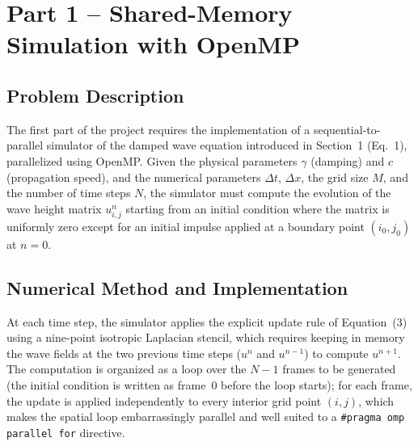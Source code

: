 \section{Part 1 -- Shared-Memory Simulation with OpenMP}
\label{sec:openmp}

\subsection{Problem Description}
The first part of the project requires the implementation of a
sequential-to-parallel simulator of the damped wave equation
introduced in Section~1 (Eq.~1), parallelized using OpenMP. Given
the physical parameters $\gamma$ (damping) and $c$ (propagation
speed), and the numerical parameters $\Delta t$, $\Delta x$, the
grid size $M$, and the number of time steps $N$, the simulator must
compute the evolution of the wave height matrix $u^n_{i,j}$ starting
from an initial condition where the matrix is uniformly zero except
for an initial impulse applied at a boundary point $(i_0, j_0)$ at
$n=0$.

\subsection{Numerical Method and Implementation}
\label{sec:numerical-method}
At each time step, the simulator applies the explicit update rule
of Equation~(3) using a nine-point isotropic Laplacian stencil,
which requires keeping in memory the wave fields at the two
previous time steps ($u^n$ and $u^{n-1}$) to compute $u^{n+1}$.
The computation is organized as a loop over the $N-1$ frames to be
generated (the initial condition is written as frame~0 before the
loop starts); for each frame, the update is applied independently to
every interior grid point $(i,j)$, which makes the spatial loop
embarrassingly parallel and well suited to a \texttt{\#pragma omp
parallel for} directive.

